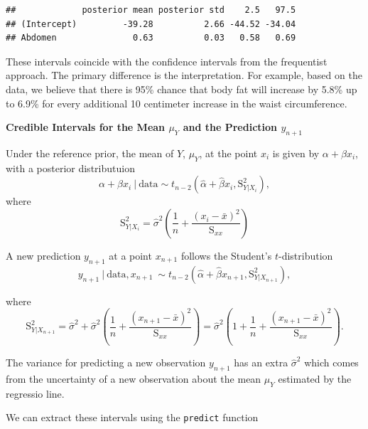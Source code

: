\documentclass[]{book}
\theoremstyle{definition}
\theoremstyle{definition}
\theoremstyle{definition}
\theoremstyle{remark}
\begin{document}
\begin{verbatim}
##             posterior mean posterior std    2.5   97.5
## (Intercept)         -39.28          2.66 -44.52 -34.04
## Abdomen               0.63          0.03   0.58   0.69
\end{verbatim}

These intervals coincide with the confidence intervals from the
frequentist approach. The primary difference is the interpretation. For
example, based on the data, we believe that there is 95\% chance that
body fat will increase by 5.8\% up to 6.9\% for every additional 10
centimeter increase in the waist circumference.

\textbf{Credible Intervals for the Mean \(\mu_Y\) and the Prediction
\(y_{n+1}\)}

Under the reference prior, the mean of \(Y\), \(\mu_Y\), at the point
\(x_i\) is given by \(\alpha + \beta x_i\), with a posterior
distributuion \[ 
\alpha + \beta x_i ~|~ \text{data} \sim t_{n-2}(\hat{\alpha} + \hat{\beta} x_i, \text{S}_{Y|X_i}^2), 
\] where \[
\text{S}_{Y|X_i}^2 = \hat{\sigma}^2\left(\frac{1}{n}+\frac{(x_i-\bar{x})^2}{\text{S}_{xx}}\right)
\]

A new prediction \(y_{n+1}\) at a point \(x_{n+1}\) follows the
Student's \(t\)-distribution \[ 
y_{n+1}~|~\text{data}, x_{n+1}\ \sim t_{n-2}\left(\hat{\alpha}+\hat{\beta} x_{n+1},\text{S}_{Y|X_{n+1}}^2\right), 
\]

where \[ 
\text{S}_{Y|X_{n+1}}^2 =\hat{\sigma}^2+\hat{\sigma}^2\left(\frac{1}{n}+\frac{(x_{n+1}-\bar{x})^2}{\text{S}_{xx}}\right) = \hat{\sigma}^2\left(1+\frac{1}{n}+\frac{(x_{n+1}-\bar{x})^2}{\text{S}_{xx}}\right).
\]

The variance for predicting a new observation \(y_{n+1}\) has an extra
\(\hat{\sigma}^2\) which comes from the uncertainty of a new observation
about the mean \(\mu_Y\) estimated by the regressio line.

We can extract these intervals using the \texttt{predict} function
\end{document}
